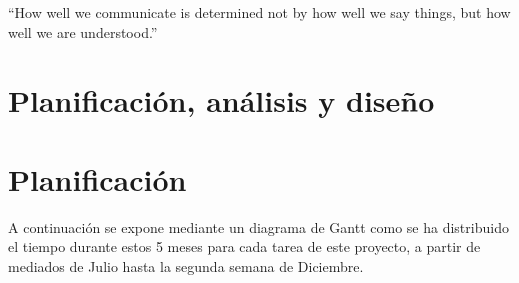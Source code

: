 \begin{savequote}[75mm]
“How well we communicate is determined not by how well we say things, but how well we are understood.” 
\end{savequote}

\chapter{Planificación, análisis y diseño}
\chapter*{Planificación}
A continuación se expone mediante un \textcolor{SchoolColor}{diagrama de Gantt} como se ha distribuido el tiempo durante estos 5 meses para cada tarea de este proyecto, a partir de mediados de Julio hasta la segunda semana de Diciembre.
\\[\baselineskip]
